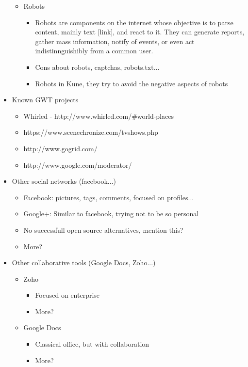 \begin{itemize}
\begin{itemize}
\begin{itemize}
      \end{itemize}
      \item Robots
      \begin{itemize}
        \item Robots are components on the internet whose objective is to parse content, mainly text [link], and react to it. They can generate reports, gather mass information, notify of events, or even act indistinnguishibly from a common user.
        \item Cons about robots, captchas, robots.txt...
        \item Robots in Kune, they try to avoid the negative aspects of robots
      \end{itemize}
    \end{itemize}
  \item Known GWT projects
  \begin{itemize}
    \item Whirled - http://www.whirled.com/#world-places
    \item https://www.scenechronize.com/tvshows.php
    \item http://www.gogrid.com/
    \item http://www.google.com/moderator/
  \end{itemize}
  \item Other social networks (facebook...)
  \begin{itemize}
    \item Facebook: pictures, tags, comments, focused on profiles...
    \item Google+: Similar to facebook, trying not to be so personal
    \item No successfull open source alternatives, mention this?
    \item More?
  \end{itemize}
  \item Other collaborative tools (Google Docs, Zoho...)
  \begin{itemize}
    \item Zoho
    \begin{itemize}
      \item Focused on enterprise
      \item More?
    \end{itemize}
    \item Google Docs
    \begin{itemize}
      \item Classical office, but with collaboration
      \item More?
    \end{itemize}
  \end{itemize}
  
\end{itemize}
